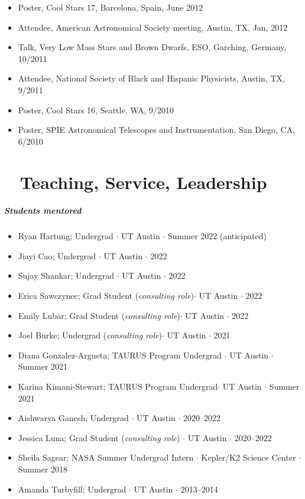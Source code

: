 \documentclass[10pt,letterpaper]{article}
\begin{document}
\begin{itemize}
    \item Poster, Cool Stars 17, Barcelona, Spain, June 2012
    \item Attendee, American Astronomical Society meeting, Austin, TX, Jan, 2012
    \item Talk, Very Low Mass Stars and Brown Dwarfs, ESO, Garching, Germany, 10/2011
    \item Attendee, National Society of Black and Hispanic Physicists, Austin, TX, 9/2011
    \item Poster, Cool Stars 16, Seattle, WA, 9/2010
    \item Poster, SPIE Astronomical Telescopes and Instrumentation, San Diego, CA, 6/2010
\end{itemize}


\section*{\faChalkboardTeacher ~ Teaching, Service, Leadership}

\subparagraph{Students mentored}
\begin{itemize}
  \item Ryan Hartung; Undergrad $\cdot$ UT Austin $\cdot$ Summer 2022 (anticipated)
  \item Jiayi Cao; Undergrad $\cdot$ UT Austin $\cdot$ 2022   
  \item Sujay Shankar; Undergrad $\cdot$ UT Austin $\cdot$ 2022 
  \item Erica Sawczynec; Grad Student (\emph{consulting role})$\cdot$ UT Austin $\cdot$ 2022 
  \item Emily Lubar; Grad Student (\emph{consulting role})$\cdot$ UT Austin $\cdot$ 2022  
  \item Joel Burke; Undergrad (\emph{consulting role})$\cdot$ UT Austin $\cdot$ 2021
  \item Diana Gonzalez-Argueta; TAURUS Program Undergrad $\cdot$ UT Austin $\cdot$ Summer 2021  
  \item Karina Kimani-Stewart; TAURUS Program Undergrad$\cdot$ UT Austin $\cdot$ Summer 2021 
  \item Aishwarya Ganesh; Undergrad $\cdot$ UT Austin $\cdot$  2020--2022 
  \item Jessica Luna; Grad Student (\emph{consulting role}) $\cdot$ UT Austin $\cdot$  2020--2022 
  \item Sheila Sagear; NASA Summer Undergrad Intern $\cdot$ Kepler/K2 Science Center $\cdot$ Summer 2018 
  \item Amanda Turbyfill; Undergrad $\cdot$ UT Austin $\cdot$ 2013--2014 
\end{itemize}
\end{document}
